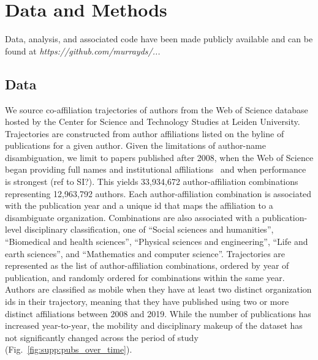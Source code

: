 \documentclass[12pt]{article} %
\begin{document}
%
%
\section*{Data and Methods}
\label{sec:datamethods} %

Data, analysis, and associated code have been made publicly available and can be found at \textit{https://github.com/murrayds/...}


\subsection*{Data}
We source co-affiliation trajectories of authors from the Web of Science database hosted by the Center for Science and Technology Studies at Leiden University. 
Trajectories are constructed from author affiliations listed on the byline of publications for a given author.
Given the limitations of author-name disambiguation, we limit to papers published after 2008, when the Web of Science began providing full names and institutional affiliations~\autocite{caron2014disambiguation} and when performance is strongest (ref to SI?). 
This yields 33,934,672 author-affiliation combinations representing 12,963,792 authors. 
Each author-affiliation combination is associated with the publication year and a unique id that maps the affiliation to a disambiguate organization. 
Combinations are also associated with a publication-level disciplinary classification, one of ``Social sciences and humanities'',
``Biomedical and health sciences'', ``Physical sciences and engineering'', ``Life and earth sciences'', and ``Mathematics and computer science''.
Trajectories are represented as the list of author-affiliation combinations, ordered by year of publication, and randomly ordered for combinations within the same year. 
Authors are classified as mobile when they have at least two distinct organization ids in their trajectory, meaning that they have published using two or more distinct affiliations between 2008 and 2019.
While the number of publications has increased year-to-year, the mobility and disciplinary makeup of the dataset has not significantly changed across the period of study (Fig.~\ref{fig:supp:pubs_over_time}).
\end{document}
